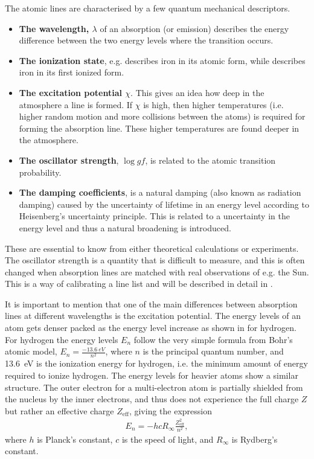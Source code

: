 The atomic lines are characterised by a few quantum mechanical descriptors.
\begin{itemize}
  \item {\bf The wavelength, $\lambda$} of an absorption (or emission) describes the energy
        difference between the two energy levels where the transition occurs.
  \item {\bf The ionization state}, e.g.  describes iron in its atomic form, while
         describes iron in its first ionized form.
  \item {\bf The excitation potential $\chi$}. This gives an idea how deep in the atmosphere a line
        is formed. If $\chi$ is high, then higher temperatures (i.e. higher random motion and more
        collisions between the atoms) is required for forming the absorption line. These higher
        temperatures are found deeper in the atmosphere.
  \item {\bf The oscillator strength}, $\log \mathit{gf}$, is related to the atomic transition
        probability.
  \item {\bf The damping coefficients}, is a natural damping (also known as radiation damping)
        caused by the uncertainty of lifetime in an energy level according to Heisenberg's
        uncertainty principle. This is related to a uncertainty in the energy level and thus a
        natural broadening is introduced.
\end{itemize}
These are essential to know from either theoretical calculations or experiments. The oscillator
strength is a quantity that is difficult to measure, and this is often changed when absorption lines
are matched with real observations of e.g. the Sun. This is a way of calibrating a line list and
will be described in detail in .

It is important to mention that one of the main differences between absorption lines at different
wavelengths is the excitation potential. The energy levels of an atom gets denser packed as the
energy level increase as shown in  for hydrogen. For hydrogen the energy levels
$E_n$ follow the very simple formula from Bohr's atomic model, $E_n=\frac{\SI{-13.6}{eV}}{n^2}$,
where $n$ is the principal quantum number, and \SI{13.6}{eV} is the ionization energy for hydrogen,
i.e. the minimum amount of energy required to ionize hydrogen. The energy levels for heavier atoms
show a similar structure. The outer electron for a multi-electron atom is partially shielded from
the nucleus by the inner electrons, and thus does not experience the full charge $Z$ but rather an
effective charge $Z_\mathrm{eff}$, giving the expression
\begin{align}
  E_n = -hcR_\infty\frac{Z_\mathrm{eff}^2}{n^2},
\end{align}
where $h$ is Planck's constant, $c$ is the speed of light, and $R_\infty$ is Rydberg's constant.

